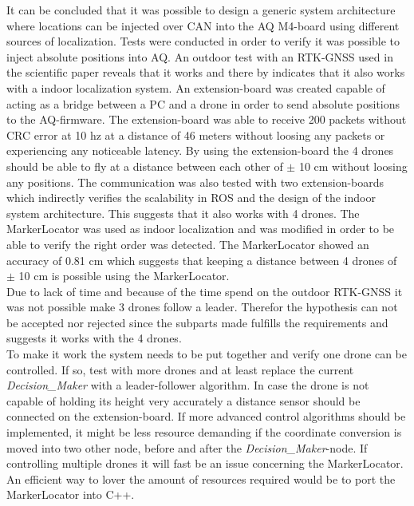 It can be concluded that it was possible to design a generic system architecture where locations can be injected over CAN into the AQ M4-board using different sources of localization. Tests were conducted in order to verify it was possible to inject absolute positions into AQ. An outdoor test with an RTK-GNSS used in the scientific paper reveals that it works and there by indicates that it also works with a indoor localization system.
An extension-board was created capable of acting as a bridge between a PC and a drone in order to send absolute positions to the AQ-firmware. The extension-board was able to receive 200 packets without CRC error at 10 hz at a distance of 46 meters without loosing any packets or experiencing any noticeable latency. By using the extension-board the 4 drones should be able to fly at a distance between each other of $\pm$ 10 cm without loosing any positions. The communication was also tested with two extension-boards which indirectly verifies the scalability in ROS and the design of the indoor system architecture. This suggests that it also works with 4 drones.
 The MarkerLocator was used as indoor localization and was modified in order to be able to verify the right order was detected. The MarkerLocator showed an accuracy of 0.81 cm which suggests that keeping a distance between 4 drones of $\pm$ 10 cm is possible using the MarkerLocator.\\

Due to lack of time and because of the time spend on the outdoor RTK-GNSS it was not possible make 3 drones follow a leader. Therefor the hypothesis can not be accepted nor rejected since the subparts made fulfills the requirements and suggests it works with the 4 drones.\\

To make it work the system needs to be put together and verify one drone can be controlled. If so, test with more drones and at least replace the current \textit{Decision\_Maker} with a leader-follower algorithm. In case the drone is not capable of holding its height very accurately a distance sensor should be connected on the extension-board. If more advanced control algorithms should be implemented, it might be less resource demanding if the coordinate conversion is moved into two other node, before and after the \textit{Decision\_Maker}-node.
If controlling multiple drones it will fast be an issue concerning the MarkerLocator. An efficient way to lover the amount of resources required would be to port the MarkerLocator into C++.